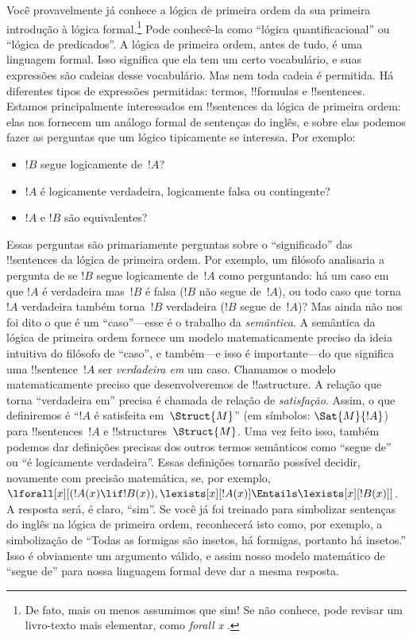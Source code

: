 \documentclass[../../../include/open-logic-section]{subfiles}
\begin{document}


Você provavelmente já conhece a lógica de primeira ordem da sua
primeira introdução à lógica formal.\footnote{De fato, mais ou menos
assumimos que sim!{} Se não conhece, pode revisar um livro-texto mais
elementar, como \emph{forall x} \citep{Magnus2021}.} Pode conhecê-la
como ``lógica quantificacional'' ou ``lógica de predicados''.  A
lógica de primeira ordem, antes de tudo, é uma linguagem formal.  Isso
significa que ela tem um certo vocabulário, e suas expressões são
cadeias desse vocabulário.  Mas nem toda cadeia é permitida.  Há
diferentes tipos de expressões permitidas: termos, !!{formula}s e
!!{sentence}s.  Estamos principalmente interessados em !!{sentence}s da
lógica de primeira ordem: elas nos fornecem um análogo formal de
sentenças do inglês, e sobre elas podemos fazer as perguntas que um
lógico tipicamente se interessa. Por exemplo:
\begin{itemize}
    \item $!B$ segue logicamente de~$!A$?
    \item $!A$ é logicamente verdadeira, logicamente falsa ou
contingente?
    \item $!A$ e $!B$ são equivalentes?
\end{itemize}

Essas perguntas são primariamente perguntas sobre o ``significado'' das
!!{sentence}s da lógica de primeira ordem.  Por exemplo, um filósofo
analisaria a pergunta de se $!B$ segue logicamente de~$!A$ como
perguntando: há um caso em que $!A$ é verdadeira mas~$!B$ é falsa
($!B$ não segue de~$!A$), ou todo caso que torna $!A$ verdadeira
também torna~$!B$ verdadeira ($!B$ segue de~$!A$)?  Mas ainda não nos
foi dito o que é um ``caso''---esse é o trabalho da \emph{semântica}.
A semântica da lógica de primeira ordem fornece um modelo matematicamente
preciso da ideia intuitiva do filósofo de ``caso'', e também---e isso
é importante---do que significa uma !!{sentence}~$!A$ ser \emph{verdadeira
em} um caso. Chamamos o modelo matematicamente preciso que
desenvolveremos de !!a{structure}. A relação que torna ``verdadeira em''
precisa é chamada de relação de \emph{satisfação}.  Assim, o que
definiremos é ``$!A$ é satisfeita em~$\Struct{M}$'' (em símbolos:
$\Sat{M}{!A}$) para !!{sentence}s~$!A$ e !!{structure}s~$\Struct{M}$. Uma vez
feito isso, também podemos dar definições precisas dos outros termos
semânticos como ``segue de'' ou ``é logicamente verdadeira''. Essas
definições tornarão possível decidir, novamente com precisão
matemática, se, por exemplo, $\lforall[x][(!A(x) \lif !B(x)),
\lexists[x][!A(x)] \Entails \lexists[x][!B(x)]]$. A resposta será, é
claro, ``sim''. Se você já foi treinado para simbolizar sentenças do
inglês na lógica de primeira ordem, reconhecerá isto como, por
exemplo, a simbolização de ``Todas as formigas são insetos, há
formigas, portanto há insetos.'' Isso é obviamente um argumento
válido, e assim nosso modelo matemático de ``segue de'' para nossa
linguagem formal deve dar a mesma resposta.
\end{document}
